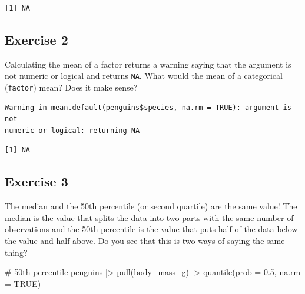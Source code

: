 \documentclass[
  letterpaper,
  DIV=11,
  numbers=noendperiod]{scrreprt}
\newenvironment{Shaded}{\begin{snugshade}}{\end{snugshade}}
\newcommand{\AttributeTok}[1]{\textcolor[rgb]{0.40,0.45,0.13}{#1}}
\newcommand{\CommentTok}[1]{\textcolor[rgb]{0.37,0.37,0.37}{#1}}
\newcommand{\ConstantTok}[1]{\textcolor[rgb]{0.56,0.35,0.01}{#1}}
\newcommand{\FloatTok}[1]{\textcolor[rgb]{0.68,0.00,0.00}{#1}}
\newcommand{\FunctionTok}[1]{\textcolor[rgb]{0.28,0.35,0.67}{#1}}
\newcommand{\NormalTok}[1]{\textcolor[rgb]{0.00,0.23,0.31}{#1}}
\newcommand{\SpecialCharTok}[1]{\textcolor[rgb]{0.37,0.37,0.37}{#1}}
\begin{document}
\begin{verbatim}
[1] NA
\end{verbatim}

\subsection{Exercise 2}\label{exercise-2-4}

Calculating the mean of a factor returns a warning saying that the
argument is not numeric or logical and returns \texttt{NA}. What would
the mean of a categorical (\texttt{factor}) mean? Does it make sense?

\begin{Shaded}
\end{Shaded}

\begin{verbatim}
Warning in mean.default(penguins$species, na.rm = TRUE): argument is not
numeric or logical: returning NA
\end{verbatim}

\begin{verbatim}
[1] NA
\end{verbatim}

\subsection{Exercise 3}\label{exercise-3-2}

The median and the 50th percentile (or second quartile) are the same
value! The median is the value that splits the data into two parts with
the same number of observations and the 50th percentile is the value
that puts half of the data below the value and half above. Do you see
that this is two ways of saying the same thing?

\begin{Shaded}
\begin{Highlighting}[]
\CommentTok{\# 50th percentile}
\NormalTok{penguins }\SpecialCharTok{|\textgreater{}} 
  \FunctionTok{pull}\NormalTok{(body\_mass\_g) }\SpecialCharTok{|\textgreater{}} 
  \FunctionTok{quantile}\NormalTok{(}\AttributeTok{prob =} \FloatTok{0.5}\NormalTok{, }\AttributeTok{na.rm =} \ConstantTok{TRUE}\NormalTok{)}
\end{Highlighting}
\end{Shaded}
\end{document}
